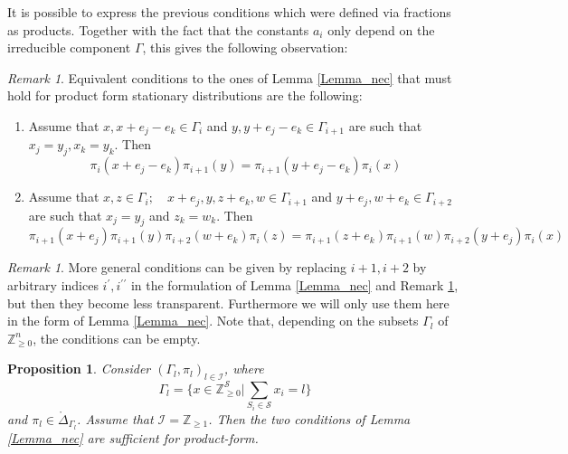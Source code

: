 \documentclass{amsart}
\newtheorem{proposition}[theorem]{Proposition}
\theoremstyle{definition}
\theoremstyle{remark}
\newtheorem{remark}[theorem]{Remark}
\theoremstyle{Conjecture/open problem}
\theoremstyle{assumption}
\theoremstyle{conjecture}
\def\Ga{\Gamma}
\def\p{^{\prime}}
\def\pp{^{\prime\prime}}
\def\cS{\mathcal{S}}
\def\Z{\mathbb{Z}}
\numberwithin{equation}{section}
\begin{document}
It is possible to express the previous conditions which were defined via fractions as products. Together with the fact that the constants $a_i$ only depend on the irreducible component $\Gamma $, this gives the following observation:
\begin{remark}\label{eq_lem}
Equivalent conditions to the ones of Lemma \ref{Lemma_nec} that must hold for product form stationary distributions are the following:
\begin{enumerate}
\item[(a)] Assume that $x,x+e_j-e_k\in \Ga_i$ and $y,y+e_j-e_k\in \Ga_{i+1}$ are such that $x_j=y_j,x_k=y_k$. Then
$$\pi_{i}(x+e_j-e_k)\pi_{i+1}(y)=\pi_{i+1}(y+e_j-e_k)\pi_i(x)   $$
\item[(b)] Assume that $x,z\in \Ga_i;\quad x+e_j,y,z+e_k,w\in \Ga_{i+1}$ and $y+e_j,w+e_k\in \Ga_{i+2}$ are such that $x_j=y_j$ and $z_k=w_k$. Then
$$\pi_{i+1}(x+e_j)\pi_{i+1}(y)\pi_{i+2}(w+e_k)\pi_i(z)=\pi_{i+1}(z+e_k)\pi_{i+1}(w)\pi_{i+2}(y+e_j)\pi_i(x)$$
\end{enumerate}

\begin{remark}\label{eq_more_gen}
More general conditions can be given by replacing $i+1,i+2$ by arbitrary indices $i\p,i\pp$ in the formulation of Lemma \ref{Lemma_nec} and Remark \ref{eq_lem}, but then they become less transparent. Furthermore we will only use them here in the form of Lemma \ref{Lemma_nec}. Note that, depending on the subsets $\Ga_l$ of $\Z_{\geq 0}^n$, the conditions can be empty.
\end{remark}

\end{remark}

\begin{proposition}\label{suff_cond}  Consider $(\Ga_l,\pi_l)_{l\in \mathcal{I}}$, where $$\Ga_l=\{x\in \Z^\cS_{\geq 0}|\sum_{S_i\in \cS} x_i=l\}$$  and $\pi_l\in \mathring\Delta_{\Ga_l}$. Assume that $\mathcal{I}=\Z_{\geq 1}$. Then the two conditions of Lemma \ref{Lemma_nec} are sufficient for product-form.
\end{proposition}
\end{document}
